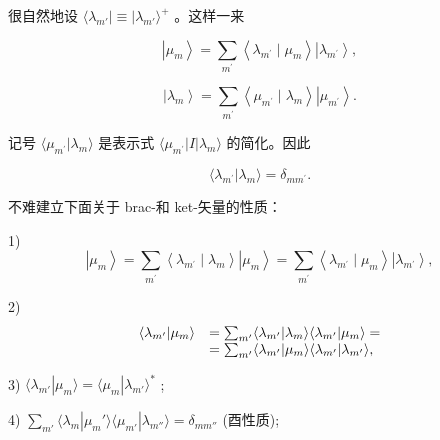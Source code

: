 很自然地设 $\langle \lambda_{m'}| \equiv |\lambda_{m'}\rangle^{+}$ 。这样一来

\begin{equation*}
\left| \mu_ {m} \right\rangle = \sum_ {m ^ {\prime}} \left\langle \lambda_ {m ^ {\prime}} \mid \mu_ {m} \right\rangle \left| \lambda_ {m ^ {\prime}} \right\rangle ,
\end{equation*}

\begin{equation*}
\left| \lambda_ {m} \right\rangle = \sum_ {m ^ {\prime}} \left\langle \mu_ {m ^ {\prime}} \mid \lambda_ {m} \right\rangle \left| \mu_ {m ^ {\prime}} \right\rangle .
\end{equation*}

记号 $\langle \mu_{m ^ {\prime}} |\lambda_{m}\rangle$ 是表示式 $\langle \mu_{m ^ {\prime}} |I|\lambda_{m}\rangle$ 的简化。因此

\begin{equation*}
\langle \lambda_ {m ^ {\prime}} | \lambda_ {m} \rangle = \delta_ {m m ^ {\prime}}.
\end{equation*}

不难建立下面关于 brac-和 ket-矢量的性质：

1)
\begin{equation*}
\left| \mu_ {m} \right\rangle = \sum_ {m ^ {\prime}} \left\langle \lambda_ {m ^ {\prime}} \mid \lambda_ {m} \right\rangle \left| \mu_ {m} \right\rangle = \sum_ {m ^ {\prime}} \left\langle \lambda_ {m ^ {\prime}} \mid \mu_ {m} \right\rangle \left| \lambda_ {m ^ {\prime}} \right\rangle ,
\end{equation*}

2)
\begin{equation*}
\begin{array}{r l} \langle \lambda_ {m ^ {\prime}} | \mu_ {m} \rangle & = \sum_ {m ^ {\prime}} \langle \lambda_ {m ^ {\prime}} | \lambda_ {m} \rangle \langle \lambda_ {m ^ {\prime}} | \mu_ {m} \rangle = \\ & = \sum_ {m ^ {\prime}} \langle \lambda_ {m ^ {\prime}} | \mu_ {m} \rangle \langle \lambda_ {m ^ {\prime}} | \lambda_ {m ^ {\prime}} \rangle , \end{array}
\end{equation*}

3) $\langle \lambda_{m'}|\mu_m\rangle = \langle \mu_m|\lambda_{m'}\rangle^*$ ;

4) $\sum_{m'}\langle \lambda_m|\mu_m' \rangle \langle \mu_{m'}|\lambda_{m''}\rangle = \delta_{mm''}$ (酉性质);

